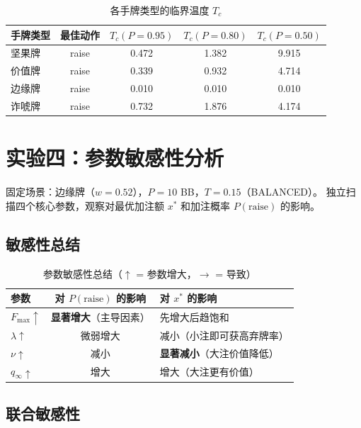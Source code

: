 \documentclass[12pt,a4paper]{ctexart}
\begin{document}
\begin{table}[H]
\centering
\caption{各手牌类型的临界温度 $T_c$}
\begin{tabular}{@{}lcccc@{}}
\toprule
\textbf{手牌类型} & \textbf{最佳动作} & $T_c(P{=}0.95)$ & $T_c(P{=}0.80)$ & $T_c(P{=}0.50)$ \\
\midrule
坚果牌  & raise & 0.472 & 1.382 & 9.915 \\
价值牌  & raise & 0.339 & 0.932 & 4.714 \\
边缘牌  & raise & 0.010 & 0.010 & 0.010 \\
诈唬牌  & raise & 0.732 & 1.876 & 4.174 \\
\bottomrule
\end{tabular}
\end{table}

\section{实验四：参数敏感性分析}

固定场景：边缘牌（$w=0.52$），$P=10$ BB，$T=0.15$（BALANCED）。
独立扫描四个核心参数，观察对最优加注额 $x^*$ 和加注概率 $P(\text{raise})$ 的影响。

\subsection{敏感性总结}

\begin{table}[H]
\centering
\caption{参数敏感性总结（$\uparrow$ = 参数增大，$\to$ = 导致）}
\begin{tabular}{@{}lcp{6cm}@{}}
\toprule
\textbf{参数} & \textbf{对 $P(\text{raise})$ 的影响} & \textbf{对 $x^*$ 的影响} \\
\midrule
$F_{\max} \uparrow$ & \textbf{显著增大}（主导因素） & 先增大后趋饱和 \\
$\lambda \uparrow$   & 微弱增大 & 减小（小注即可获高弃牌率） \\
$\nu \uparrow$      & 减小 & \textbf{显著减小}（大注价值降低） \\
$q_{\infty} \uparrow$ & 增大 & 增大（大注更有价值） \\
\bottomrule
\end{tabular}
\end{table}

\subsection{联合敏感性}
\end{document}
